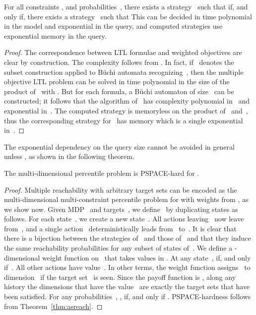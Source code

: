 \documentclass{llncs}
\newcommand\PSPACE{\textrm{\sf PSPACE}}
\begin{document}
\begin{lemma}
  For all constraints , and probabilities~,
  there exists a strategy~ such that 
  if, and only if, there exists a strategy~ such that 
  This can be decided in time polynomial in the model and exponential in the query, and computed strategies use exponential memory in the query.  
\end{lemma}
\begin{proof}
  The correspondence between LTL formulae and weighted objectives are clear by construction.
  The complexity follows from \cite{EKVY-lmcs08}. In fact, 
  if~ denotes the subset construction applied to B\"uchi automata recognizing~, 
  then the multiple objective LTL problem can be solved in time polynomial in the size of
  the product of~ with . But for each formula, a B\"uchi automaton of size~ can be constructed; it follows that the algorithm of~\cite{EKVY-lmcs08} has complexity polynomial in~ and exponential in~. 
  The computed strategy is memoryless on the product of~ and~, thus the corresponding strategy for~ has memory  which is a single exponential in~.
\end{proof}

The exponential dependency on the query size cannot be avoided in general unless , as shown in the following theorem.


\begin{theorem}
\label{thm:quant_reg_multi_dim_pspace}
  The multi-dimensional percentile problem is \PSPACE-hard for .
\end{theorem}
\begin{proof}
  Multiple reachability with arbitrary target sets can be encoded as the multi-dimensional multi-constraint percentile problem for  with weights from , as we show now.
  Given MDP~ and targets~, we define~ by duplicating states as follows.
  For each state~, we create a new state~. All actions leaving~ now leave from~,
  and a single action~ deterministically leads from~ to~.
  It is clear that there is a bijection between the strategies of~ and those of~ and that they induce the same reachability probabilities for any subset of states of~.
  We define a -dimensional weight function on~ that takes values in . At any state~, 
   if, and only if~. All other actions have value~.
  In other terms, the weight function assigns~ to dimension~ if the target set~ is seen. Since the payoff function is , along any history
  the dimensions that have the value~ are exactly the target sets that have been satisfied.
  For any probabilities~, ,
  if, and only if .
  \PSPACE-hardness follows from Theorem~\ref{thm:asreach}.
\end{proof}
\end{document}
